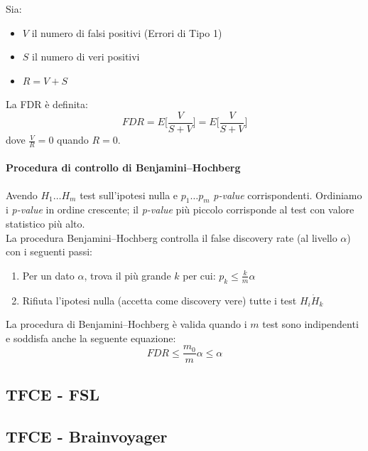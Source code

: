 \documentclass{beamer}
\begin{document}
\begin{frame}
Sia:
\begin{itemize}
\item $V$ il numero di falsi positivi (Errori di Tipo 1)
\item $S$ il numero di veri positivi 
\item $R =  V+S$ 
\end{itemize}
La FDR è definita:
\begin{equation*}
FDR = E\Big[\frac{V}{S+V}\Big] = E\Big[\frac{V}{S+V}\Big]
\end{equation*}
dove $\frac{V}{R} = 0$ quando $R = 0$.
\end{frame}

\begin{frame}
\framesubtitle{Procedura di controllo di Benjamini–Hochberg}
Avendo $H_1 \dots H_m$ test sull'ipotesi nulla e $p_1 \dots p_m$ \textit{p-value} corrispondenti. Ordiniamo i \textit{p-value} in ordine crescente; il \textit{p-value} più piccolo corrisponde al test con valore statistico più alto.\\
\smallskip
La procedura Benjamini–Hochberg controlla il false discovery rate (al livello $\alpha$) con i seguenti passi:\\
\medskip
\begin{enumerate}
\item Per un dato $\alpha$, trova il più grande $k$ per cui: $p_k \leq \frac{k}{m}\alpha$
\item Rifiuta l'ipotesi nulla (accetta come discovery vere) tutte i test $H_i \dot H_k$
\end{enumerate}
La procedura di Benjamini–Hochberg è valida quando i $m$ test sono indipendenti e soddisfa anche la seguente equazione:
\begin{equation*}
FDR \leq \frac{m_0}{m}\alpha \leq \alpha
\end{equation*}
\end{frame}


\subsection{TFCE - FSL}
\begin{frame}
\end{frame}

\subsection{TFCE - Brainvoyager}
\begin{frame}
\end{frame}
\end{document}
